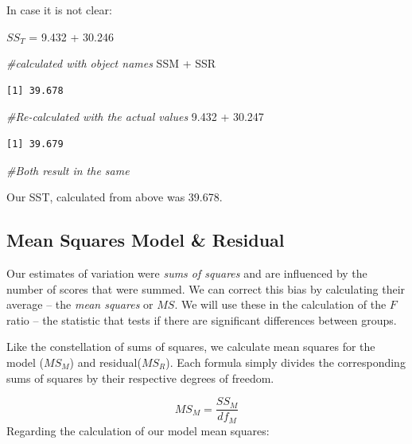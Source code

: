 \documentclass[
  11pt,
]{book}
\newenvironment{Shaded}{\begin{snugshade}}{\end{snugshade}}
\newcommand{\CommentTok}[1]{\textcolor[rgb]{0.56,0.35,0.01}{\textit{#1}}}
\newcommand{\FloatTok}[1]{\textcolor[rgb]{0.00,0.00,0.81}{#1}}
\newcommand{\NormalTok}[1]{#1}
\newcommand{\SpecialCharTok}[1]{\textcolor[rgb]{0.00,0.00,0.00}{#1}}
\begin{document}
In case it is not clear:

\(SS_T\) = 9.432 + 30.246

\begin{Shaded}
\begin{Highlighting}[]
\CommentTok{\#calculated with object names }
\NormalTok{SSM }\SpecialCharTok{+}\NormalTok{ SSR}
\end{Highlighting}
\end{Shaded}

\begin{verbatim}
[1] 39.678
\end{verbatim}

\begin{Shaded}
\begin{Highlighting}[]
\CommentTok{\#Re{-}calculated with the actual values}
\FloatTok{9.432} \SpecialCharTok{+} \FloatTok{30.247}
\end{Highlighting}
\end{Shaded}

\begin{verbatim}
[1] 39.679
\end{verbatim}

\begin{Shaded}
\begin{Highlighting}[]
\CommentTok{\#Both result in the same}
\end{Highlighting}
\end{Shaded}

Our SST, calculated from above was 39.678.

\hypertarget{mean-squares-model-residual}{%
\subsection{Mean Squares Model \& Residual}\label{mean-squares-model-residual}}

Our estimates of variation were \emph{sums of squares} and are influenced by the number of scores that were summed. We can correct this bias by calculating their average -- the \emph{mean squares} or \(MS\). We will use these in the calculation of the \(F\) ratio -- the statistic that tests if there are significant differences between groups.

Like the constellation of sums of squares, we calculate mean squares for the model (\(MS_M\)) and residual(\(MS_R\)). Each formula simply divides the corresponding sums of squares by their respective degrees of freedom.

\[MS_M = \frac{SS_{M}}{df{_{M}}}\]
Regarding the calculation of our model mean squares:
\end{document}

